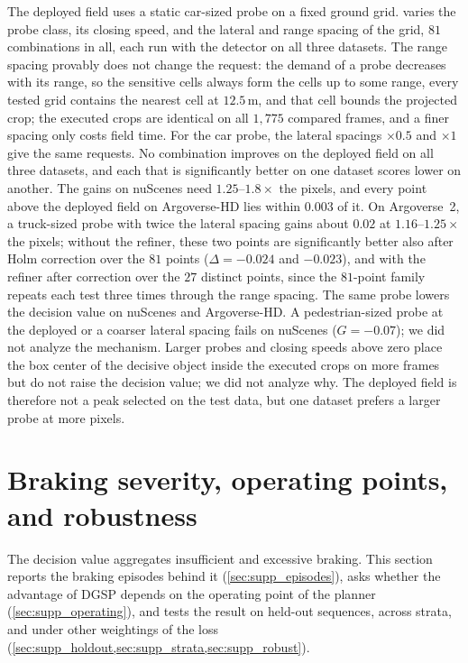 \documentclass[10pt,letterpaper]{article}
\newcommand{\method}{DGSP\xspace}
\newcommand{\G}{G}
\theoremstyle{remark}
\theoremstyle{plain}
\theoremstyle{definition}
\begin{document}
The deployed field uses a static car-sized probe on a fixed ground grid.
 varies the probe class, its closing speed, and the lateral and range spacing of the grid, $81$ combinations in all, each run with the detector on all three datasets.
The range spacing provably does not change the request: the demand of a probe decreases with its range, so the sensitive cells always form the cells up to some range, every tested grid contains the nearest cell at $12.5$\,m, and that cell bounds the projected crop; the executed crops are identical on all $1{,}775$ compared frames, and a finer spacing only costs field time.
For the car probe, the lateral spacings $\times0.5$ and $\times1$ give the same requests.
No combination improves on the deployed field on all three datasets, and each that is significantly better on one dataset scores lower on another.
The gains on nuScenes need $1.25$--$1.8\times$ the pixels, and every point above the deployed field on Argoverse-HD lies within $0.003$ of it.
On Argoverse~2, a truck-sized probe with twice the lateral spacing gains about $0.02$ at $1.16$--$1.25\times$ the pixels; without the refiner, these two points are significantly better also after Holm correction over the $81$ points ($\Delta=-0.024$ and $-0.023$), and with the refiner after correction over the $27$ distinct points, since the $81$-point family repeats each test three times through the range spacing.
The same probe lowers the decision value on nuScenes and Argoverse-HD.
A pedestrian-sized probe at the deployed or a coarser lateral spacing fails on nuScenes ($\G=-0.07$); we did not analyze the mechanism.
Larger probes and closing speeds above zero place the box center of the decisive object inside the executed crops on more frames but do not raise the decision value; we did not analyze why.
The deployed field is therefore not a peak selected on the test data, but one dataset prefers a larger probe at more pixels.

\section{Braking severity, operating points, and robustness}
\label{sec:supp_braking}

The decision value aggregates insufficient and excessive braking.
This section reports the braking episodes behind it (\cref{sec:supp_episodes}), asks whether the advantage of \method depends on the operating point of the planner (\cref{sec:supp_operating}), and tests the result on held-out sequences, across strata, and under other weightings of the loss (\cref{sec:supp_holdout,sec:supp_strata,sec:supp_robust}).
\end{document}
